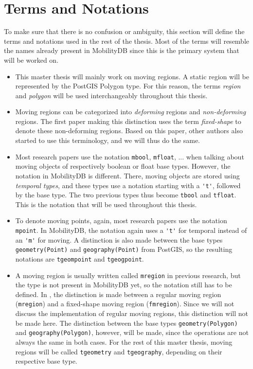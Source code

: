\section{Terms and Notations}

To make sure that there is no confusion or ambiguity, this section will define the terms and notations used in the rest of the thesis. Most of the terms will resemble the names already present in MobilityDB since this is the primary system that will be worked on.

\begin{itemize}
    \item This master thesis will mainly work on moving regions. A static region will be represented by the PostGIS Polygon type. For this reason, the terms \textit{region} and \textit{polygon} will be used interchangeably throughout this thesis.

    \item Moving regions can be categorized into \textit{deforming} regions and \textit{non-deforming} regions. The first paper \cite{fmregion} making this distinction uses the term \textit{fixed-shape} to denote these non-deforming regions. Based on this paper, other authors \cite{modeling_and_representing, polyhedra} also started to use this terminology, and we will thus do the same.

    \item Most research papers use the notation \lstinline{mbool}, \lstinline{mfloat}, ... when talking about moving objects of respectively boolean or float base types. However, the notation in MobilityDB is different. There, moving objects are stored using \textit{temporal types}, and these types use a notation starting with a \lstinline{'t'}, followed by the base type. The two previous types thus become \lstinline{tbool} and \lstinline{tfloat}. This is the notation that will be used throughout this thesis.

    \item To denote moving points, again, most research papers use the notation \lstinline{mpoint}. In MobilityDB, the notation again uses a \lstinline{'t'} for temporal instead of an \lstinline{'m'} for moving. A distinction is also made between the base types \lstinline{geometry(Point)} and \lstinline{geography(Point)} from PostGIS, so the resulting notations are \lstinline{tgeompoint} and \lstinline{tgeogpoint}.

    \item A moving region is usually written called \lstinline{mregion} in previous research, but the type is not present in MobilityDB yet, so the notation still has to be defined. In \cite{fmregion}, the distinction is made between a regular moving region (\lstinline{mregion}) and a fixed-shape moving region (\lstinline{fmregion}). Since we will not discuss the implementation of regular moving regions, this distinction will not be made here. The distinction between the base types \lstinline{geometry(Polygon)} and \lstinline{geography(Polygon)}, however, will be made, since the operations are not always the same in both cases. For the rest of this master thesis, moving regions will be called \lstinline{tgeometry} and \lstinline{tgeography}, depending on their respective base type.


\end{itemize}

